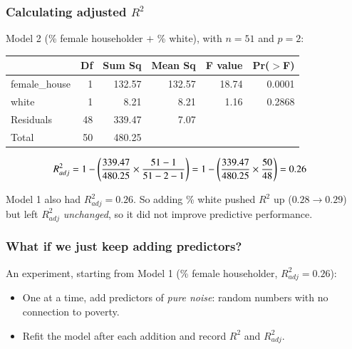 \documentclass[slidestop,compress,mathserif]{beamer}
\begin{document}
\begin{frame}
\frametitle{Calculating adjusted $R^2$}

Model 2 (\% female householder $+$ \% white), with $n=51$ and $p=2$:

{\small
\begin{center}
\begin{tabular}{lrrrrr}
\toprule
 & Df & Sum Sq & Mean Sq & F value & Pr($>$F) \\
\midrule
female\_house & 1 & 132.57 & 132.57 & 18.74 & 0.0001 \\
white & 1 & 8.21 & 8.21 & 1.16 & 0.2868 \\
Residuals & 48 & 339.47 & 7.07 &  &  \\
\midrule
Total & 50 & 480.25 & & & \\
\bottomrule
\end{tabular}
\end{center}}

\pause
\vspace{-0.4em}
{\small
\begin{align*}
R^2_{adj} &= 1 - \left(  \frac{339.47}{480.25} \times \frac{51-1}{51-2-1}  \right)
= 1 - \left(  \frac{339.47}{480.25} \times \frac{50}{48}  \right) = 0.26
\end{align*}}

\pause
\vspace{-0.4em}
Model 1 also had $R^2_{adj}=0.26$. So adding \% white pushed $R^2$ up ($0.28\to0.29$) but left $R^2_{adj}$ \emph{unchanged}, so it did not improve predictive performance. 

\end{frame}
\begin{frame}
\frametitle{What if we just keep adding predictors?}

An experiment, starting from Model 1 (\% female householder, $R^2_{adj}=0.26$):

\begin{itemize}
\item One at a time, add predictors of \emph{pure noise}: random numbers with no connection to poverty.
\item Refit the model after each addition and record $R^2$ and $R^2_{adj}$.
\end{itemize}

\pause
{}
\end{frame}
\end{document}
